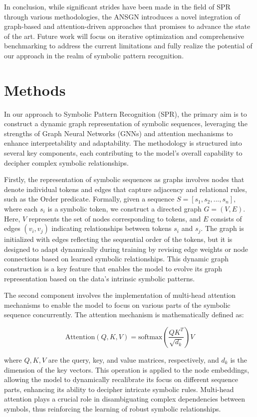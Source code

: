 \documentclass{article}
\begin{document}
In conclusion, while significant strides have been made in the field of SPR through various methodologies, the ANSGN introduces a novel integration of graph-based and attention-driven approaches that promises to advance the state of the art. Future work will focus on iterative optimization and comprehensive benchmarking to address the current limitations and fully realize the potential of our approach in the realm of symbolic pattern recognition.

\section{Methods}
In our approach to Symbolic Pattern Recognition (SPR), the primary aim is to construct a dynamic graph representation of symbolic sequences, leveraging the strengths of Graph Neural Networks (GNNs) and attention mechanisms to enhance interpretability and adaptability. The methodology is structured into several key components, each contributing to the model's overall capability to decipher complex symbolic relationships.

Firstly, the representation of symbolic sequences as graphs involves nodes that denote individual tokens and edges that capture adjacency and relational rules, such as the Order predicate. Formally, given a sequence \( S = [s_1, s_2, ..., s_n] \), where each \( s_i \) is a symbolic token, we construct a directed graph \( G = (V, E) \). Here, \( V \) represents the set of nodes corresponding to tokens, and \( E \) consists of edges \( (v_i, v_j) \) indicating relationships between tokens \( s_i \) and \( s_j \). The graph is initialized with edges reflecting the sequential order of the tokens, but it is designed to adapt dynamically during training by revising edge weights or node connections based on learned symbolic relationships. This dynamic graph construction is a key feature that enables the model to evolve its graph representation based on the data's intrinsic symbolic patterns.

The second component involves the implementation of multi-head attention mechanisms to enable the model to focus on various parts of the symbolic sequence concurrently. The attention mechanism is mathematically defined as:

\[
\text{Attention}(Q, K, V) = \text{softmax}\left(\frac{QK^T}{\sqrt{d_k}}\right) V
\]

where \( Q, K, V \) are the query, key, and value matrices, respectively, and \( d_k \) is the dimension of the key vectors. This operation is applied to the node embeddings, allowing the model to dynamically recalibrate its focus on different sequence parts, enhancing its ability to decipher intricate symbolic rules. Multi-head attention plays a crucial role in disambiguating complex dependencies between symbols, thus reinforcing the learning of robust symbolic relationships.
\end{document}
